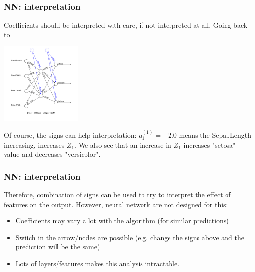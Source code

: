 \begin{frame}
\frametitle{NN: interpretation}
Coefficients should be interpreted with care, if not interpreted at all. Going back to
\begin{center}
\includegraphics[width=4cm]{../../Graphs/NN_Iris.pdf}
\end{center}
Of course, the signs can help interpretation: $a_1^{(1)}=-2.0$ means the Sepal.Length increasing, increases $Z_1$. We also see that an increase in $Z_1$ increases "setosa" value and decreases "versicolor". 
\end{frame}
\begin{frame}
\frametitle{NN: interpretation}
Therefore, combination of signs can be used to try to interpret the effect of features on the output. However, neural network are not designed for this:
\begin{itemize}
\item Coefficients may vary a lot with the algorithm (for similar predictions)
\item Switch in the arrow/nodes are possible (e.g. change the signs above and the prediction will be the same)
\item Lots of layers/features makes this analysis intractable. 
\end{itemize}
\end{frame}
 
